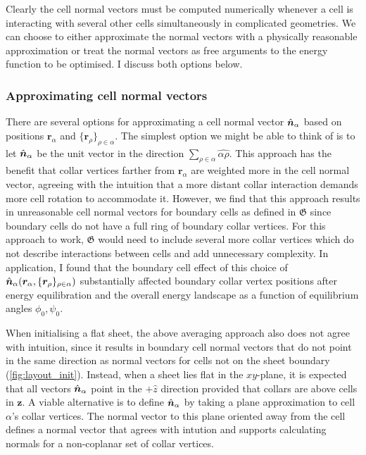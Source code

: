 Clearly the cell normal vectors must be computed numerically whenever a cell is interacting with several other cells simultaneously in complicated geometries. 
We can choose to either approximate the normal vectors with a physically reasonable approximation or treat the normal vectors as free arguments to the energy function to be optimised.
I discuss both options below. 

\subsubsection{Approximating cell normal vectors}

There are several options for approximating a cell normal vector $\hat{\bm{n}}_\alpha$ based on positions $\bm{r}_\alpha$ and $\{ \bm{r}_\rho\}_{\rho\in\alpha}$. The simplest option we might be able to think of is to let $\hat{\bm{n}}_\alpha$ be the unit vector in the direction $\sum_{\rho\in\alpha}\hat{\alpha\rho}$. 
This approach has the benefit that collar vertices farther from $\bm{r}_\alpha$ are weighted more in the cell normal vector, agreeing with the intuition that a more distant collar interaction demands more cell rotation to accommodate it. 
However, we find that this approach results in unreasonable cell normal vectors for boundary cells as defined in $\mathfrak{G}$ since boundary cells do not have a full ring of boundary collar vertices. 
For this approach to work, $\mathfrak{G}$ would need to include several more collar vertices which do not describe interactions between cells and add unnecessary complexity.
In application, I found that the boundary cell effect of this choice of $\hat{\bm{n}}_\alpha(\bm{r}_\alpha, \{\bm{r}_\rho\}_{\rho\in\alpha})$ substantially affected boundary collar vertex positions after energy equilibration and the overall energy landscape as a function of equilibrium angles $\phi_0, \psi_0$. 

When initialising a flat sheet, the above averaging approach also does not agree with intuition, since it results in boundary cell normal vectors that do not point in the same direction as normal vectors for cells not on the sheet boundary (\cref{fig:layout_init}). Instead, when a sheet lies flat in the $xy$-plane, it is expected that all vectors $\hat{\bm{n}}_\alpha$ point in the $+\hat{z}$ direction provided that collars are above cells in $\bm{z}$. 
A viable alternative is to define $\hat{\bm{n}}_\alpha$ by taking a plane approximation to cell $\alpha$'s collar vertices. 
The normal vector to this plane oriented away from the cell defines a normal vector that agrees with intution and supports calculating normals for a non-coplanar set of collar vertices.

